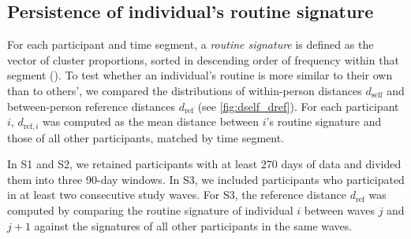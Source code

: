 \documentclass[pdflatex,sn-vancouver,Numbered]{bst/sn-jnl}%
\theoremstyle{thmstyleone}%
\theoremstyle{thmstyletwo}%
\theoremstyle{thmstylethree}%
\begin{document}

\subsection*{Persistence of individual's routine signature} \label{sec:results:signature_persistence}

For each participant and time segment, a \textit{routine signature} is defined as the vector of cluster proportions, sorted in descending order of frequency within that segment (). To test whether an individual’s routine is more similar to their own than to others’, we compared the distributions of within-person distances \(d_{\text{self}}\) and between-person reference distances \(d_{\text{ref}}\) (see \autoref{fig:dself_dref}). For each participant \(i\), \(d_{\text{ref},i}\) was computed as the mean distance between \(i\)’s routine signature and those of all other participants, matched by time segment.

In S1 and S2, we retained participants with at least 270 days of data and divided them into three 90-day windows. In S3, we included participants who participated in at least two consecutive study waves. For S3, the reference distance \(d_{\text{ref}}\) was computed by comparing the routine signature of individual \(i\) between waves \(j\) and \(j+1\) against the signatures of all other participants in the same waves.
\end{document}
